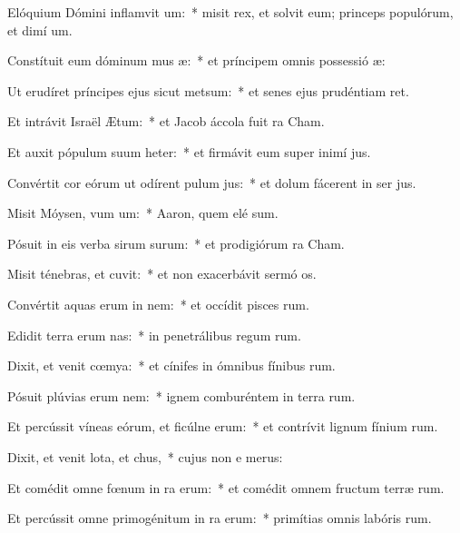 \item Elóquium Dómini inflamvit um:~* misit rex, et solvit eum; princeps populórum, et dimí um.
\item Constítuit eum dóminum mus æ:~* et príncipem omnis possessió æ:
\item Ut erudíret príncipes ejus sicut metsum:~* et senes ejus prudéntiam ret.
\item Et intrávit Israël  Ætum:~* et Jacob áccola fuit  ra Cham.
\item Et auxit pópulum suum heter:~* et firmávit eum super inimí jus.
\item Convértit cor eórum ut odírent pulum jus:~* et dolum fácerent in ser jus.
\item Misit Móysen, vum um:~* Aaron, quem elé sum.
\item Pósuit in eis verba sirum surum:~* et prodigiórum  ra Cham.
\item Misit ténebras, et cuvit:~* et non exacerbávit sermó os.
\item Convértit aquas erum in nem:~* et occídit pisces rum.
\item Edidit terra erum nas:~* in penetrálibus regum rum.
\item Dixit, et venit cœmya:~* et cínifes in ómnibus fínibus rum.
\item Pósuit plúvias erum nem:~* ignem comburéntem in terra rum.
\item Et percússit víneas eórum, et ficúlne erum:~* et contrívit lignum fínium rum.
\item Dixit, et venit lota, et chus,~* cujus non e merus:
\item Et comédit omne fœnum in ra erum:~* et comédit omnem fructum terræ rum.
\item Et percússit omne primogénitum in ra erum:~* primítias omnis labóris rum.
